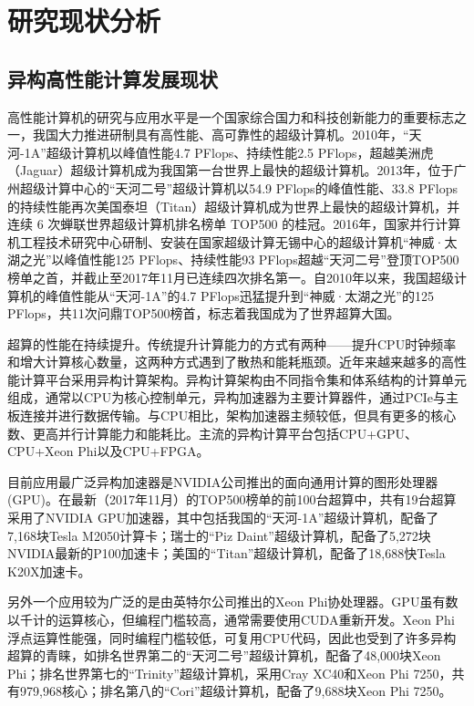 \documentclass[degree=doctor]{thuthesis}
\begin{document}
\chapter{研究现状分析}
\label{ch:研究现状分析}

\section{异构高性能计算发展现状}
高性能计算机的研究与应用水平是一个国家综合国力和科技创新能力的重要标志之一，我国大力推进研制具有高性能、高可靠性的超级计算机。2010年，“天河-1A”\cite{yang2011tianhe}超级计算机以峰值性能4.7 PFlops、持续性能2.5 PFlops，超越美洲虎（Jaguar）超级计算机成为我国第一台世界上最快的超级计算机。2013年，位于广州超级计算中心的“天河二号”超级计算机\cite{liao2014milkyway}以54.9 PFlops的峰值性能、33.8 PFlops的持续性能再次美国泰坦（Titan）超级计算机成为世界上最快的超级计算机，并连续 6 次蝉联世界超级计算机排名榜单 TOP500 的桂冠。2016年，国家并行计算机工程技术研究中心研制、安装在国家超级计算无锡中心的超级计算机“神威·太湖之光”\cite{fu2016sunway}以峰值性能125 PFlops、持续性能93 PFlops超越“天河二号”登顶TOP500榜单之首，并截止至2017年11月已连续四次排名第一。自2010年以来，我国超级计算机的峰值性能从“天河-1A”的4.7 PFlops迅猛提升到“神威·太湖之光”的125 PFlops，共11次问鼎TOP500榜首，标志着我国成为了世界超算大国。

超算的性能在持续提升。传统提升计算能力的方式有两种——提升CPU时钟频率和增大计算核心数量，这两种方式遇到了散热和能耗瓶颈。近年来越来越多的高性能计算平台采用异构计算架构\cite{buyya1999high}。异构计算架构由不同指令集和体系结构的计算单元组成，通常以CPU为核心控制单元，异构加速器为主要计算器件，通过PCIe与主板连接并进行数据传输。与CPU相比，架构加速器主频较低，但具有更多的核心数、更高并行计算能力和能耗比\cite{hong2010integrated}。主流的异构计算平台包括CPU+GPU、CPU+Xeon Phi以及CPU+FPGA。

目前应用最广泛异构加速器是NVIDIA公司推出的面向通用计算的图形处理器\cite{nvidia2008programming}(GPU)。在最新（2017年11月）的TOP500榜单的前100台超算中，共有19台超算采用了NVIDIA GPU加速器，其中包括我国的“天河-1A”超级计算机，配备了7,168块Tesla M2050计算卡；瑞士的“Piz Daint”超级计算机\cite{PIZDAINT}，配备了5,272块NVIDIA最新的P100加速卡；美国的“Titan”超级计算机\cite{shimpi2012inside}，配备了18,688快Tesla K20X加速卡。

另外一个应用较为广泛的是由英特尔公司推出的Xeon Phi协处理器\cite{jeffers2013intel}。GPU虽有数以千计的运算核心，但编程门槛较高，通常需要使用CUDA\cite{cook2012cuda}重新开发。Xeon Phi浮点运算性能强，同时编程门槛较低，可复用CPU代码，因此也受到了许多异构超算的青睐，如排名世界第二的“天河二号”超级计算机，配备了48,000块Xeon Phi\cite{liao2014milkyway}；排名世界第七的“Trinity”超级计算机\cite{Trinity}，采用Cray XC40和Xeon Phi 7250，共有979,968核心；排名第八的“Cori”超级计算机\cite{doerfler2018evaluating}，配备了9,688块Xeon Phi 7250。
\end{document}
